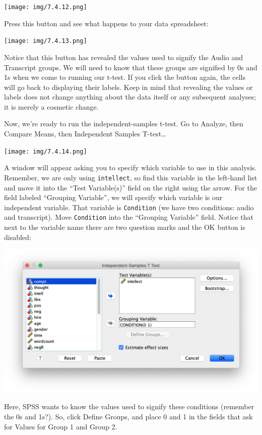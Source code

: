 \documentclass[]{book}
\begin{document}
\texttt{[image: img/7.4.12.png]}

Press this button and see what happens to your data spreadsheet:

\texttt{[image: img/7.4.13.png]}

Notice that this button has revealed the values used to signify the
Audio and Transcript groups. We will need to know that these groups are
signified by 0s and 1s when we come to running our t-test. If you click
the button again, the cells will go back to displaying their labels.
Keep in mind that revealing the values or labels does not change
anything about the data itself or any subsequent analyses; it is merely
a cosmetic change.

Now, we're ready to run the independent-samples t-test. Go to {Analyze},
then {Compare Means}, then {Independent Samples T-test\ldots{}}

\texttt{[image: img/7.4.14.png]}

A window will appear asking you to specify which variable to use in this
analysis. Remember, we are only using \texttt{intellect}, so find this
variable in the left-hand list and move it into the ``Test Variable(s)''
field on the right using the arrow. For the field labeled ``Grouping
Variable'', we will specify which variable is our independent variable.
That variable is \texttt{Condition} (we have two conditions: audio and
transcript). Move \texttt{Condition} into the ``Grouping Variable''
field. Notice that next to the variable name there are two question
marks and the OK button is disabled:

\includegraphics{img/7.4.15.png}

Here, SPSS wants to know the values used to signify these conditions
(remember the 0s and 1s?). So, click {Define Groups}, and place 0 and 1
in the fields that ask for Values for Group 1 and Group 2.
\end{document}
